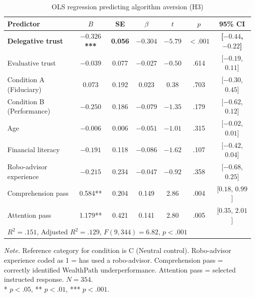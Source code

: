 \begin{table}[htbp]
\centering
\small
\caption{OLS regression predicting algorithm aversion (H3)}
\label{tab:reg_h3}
\begin{tabular}{lcccccc}
\toprule
Predictor & $B$ & SE & $\beta$ & $t$ & $p$ & 95\% CI \\
\midrule
\textbf{Delegative trust}    & \textbf{$-0.326$***} & \textbf{0.056} & \textbf{$-0.304$} & \textbf{$-5.79$} & \textbf{$< .001$} & \textbf{[$-0.44$, $-0.22$]} \\
Evaluative trust              & $-0.039$             & 0.077          & $-0.027$           & $-0.50$           & .614 & [$-0.19$, $0.11$] \\
Condition A (Fiduciary)       & 0.073                & 0.192          & 0.023              & 0.38              & .703 & [$-0.30$, $0.45$] \\
Condition B (Performance)     & $-0.250$             & 0.186          & $-0.079$           & $-1.35$           & .179 & [$-0.62$, $0.12$] \\
Age                           & $-0.006$             & 0.006          & $-0.051$           & $-1.01$           & .315 & [$-0.02$, $0.01$] \\
Financial literacy            & $-0.191$             & 0.118          & $-0.086$           & $-1.62$           & .107 & [$-0.42$, $0.04$] \\
Robo-advisor experience       & $-0.215$             & 0.234          & $-0.047$           & $-0.92$           & .358 & [$-0.68$, $0.25$] \\
Comprehension pass            & 0.584**              & 0.204          & 0.149              & 2.86              & .004 & [$0.18$, $0.99$] \\
Attention pass                & 1.179**              & 0.421          & 0.141              & 2.80              & .005 & [$0.35$, $2.01$] \\
\midrule
\multicolumn{7}{l}{$R^2 = .151$, Adjusted $R^2 = .129$, $F(9, 344) = 6.82$, $p < .001$} \\
\bottomrule
\end{tabular}
\begin{flushleft}
\footnotesize
\textit{Note.} Reference category for condition is C (Neutral control). Robo-advisor experience coded as 1 = has used a robo-advisor. Comprehension pass = correctly identified WealthPath underperformance. Attention pass = selected instructed response. $N = 354$. \\
* $p < .05$, ** $p < .01$, *** $p < .001$.
\end{flushleft}
\end{table}
